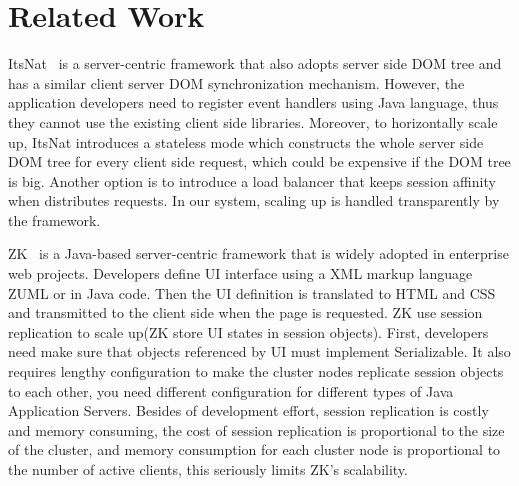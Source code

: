 \section{Related Work}
\label{sec:related}
ItsNat~\cite{santamariaitsnat} is a server-centric framework that also adopts server side DOM tree
and has a similar client server DOM synchronization mechanism.
However, the application developers need to register event handlers using Java
language, thus they cannot use the existing client side \js{} libraries.
Moreover, to horizontally scale up, ItsNat introduces a stateless mode which
constructs the whole server side DOM tree for every client side request,
which could be expensive if the DOM tree is big.
Another option is to introduce a load balancer that 
keeps session affinity when distributes requests.
In our system, scaling up is handled transparently by the framework.





ZK~\cite{chen2007zk} is a Java-based server-centric framework that is widely adopted in enterprise web projects.
Developers define UI interface using a XML markup language ZUML or in Java code.
Then the UI definition is translated to HTML and CSS and transmitted to the client side
when the page is requested.
ZK use session replication to scale up(ZK store UI states in session objects).
First, developers need make sure that objects referenced by UI must implement Serializable.
It also requires lengthy configuration to make the cluster nodes 
replicate session objects to each other,
you need different configuration for different types of Java Application Servers.
Besides of development effort, session replication is costly and memory consuming, 
the cost of session replication is proportional to the size of the cluster,
and memory consumption for each cluster node is proportional to the number of active
clients,
this seriously limits ZK's scalability.

